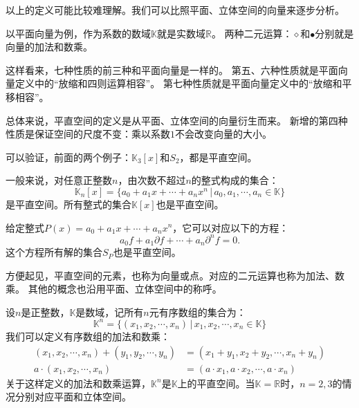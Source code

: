 \documentclass[12pt,UTF8]{ctexbook}
\begin{document}
以上的定义可能比较难理解。我们可以比照平面、立体空间的向量来逐步分析。

以平面向量为例，作为系数的数域$\mathbb{K}$就是实数域$\mathbb{R}$。
两种二元运算：$\diamond$和$\bullet$分别就是向量的加法和数乘。

这样看来，七种性质的前三种和平面向量是一样的。
第五、六种性质就是平面向量定义中的“放缩和四则运算相容”。
第七种性质就是平面向量定义中的“放缩和平移相容”。

总体来说，平直空间的定义是从平面、立体空间的向量衍生而来。
新增的第四种性质是保证空间的尺度不变：乘以系数$1$不会改变向量的大小。

可以验证，前面的两个例子：$\mathbb{K}_3[x]$和$S_2$，都是平直空间。

一般来说，对任意正整数$n$，由次数不超过$n$的整式构成的集合：
$$ \mathbb{K}_n[x] = \{a_0 + a_1 x + \cdots + a_n x^n \, | \, a_0, a_1, \cdots , a_n \in \mathbb{K}\} $$
是平直空间。所有整式的集合$\mathbb{K}[x]$也是平直空间。

给定整式$P(x) = a_0 + a_1 x + \cdots + a_n x^n$，它可以对应以下的方程：
$$ a_0 f + a_1 \partial f + \cdots + a_n \partial^n f = 0. $$
这个方程所有解的集合$S_P$也是平直空间。

方便起见，平直空间的元素，也称为向量或点。对应的二元运算也称为加法、数乘。
其他的概念也沿用平面、立体空间中的称呼。

设$n$是正整数，$\mathbb{K}$是数域，记所有$n$元有序数组的集合为：
$$ \mathbb{K}^n = \{(x_1, x_2, \cdots , x_n) \, | \, x_1, x_2, \cdots , x_n \in \mathbb{K}\}$$
我们可以定义有序数组的加法和数乘：
\begin{align*}
    (x_1, x_2, \cdots , x_n) + (y_1, y_2, \cdots , y_n) &= (x_1 + y_1, x_2 + y_2, \cdots , x_n + y_n) \\
    a\cdot (x_1, x_2, \cdots , x_n) &= (a\cdot x_1, a\cdot x_2, \cdots , a\cdot x_n)
\end{align*}
关于这样定义的加法和数乘运算，$\mathbb{K}^n$是$\mathbb{K}$上的平直空间。当$\mathbb{K}=\mathbb{R}$时，$n=2,3$的情况分别对应平面和立体空间。
\end{document}

